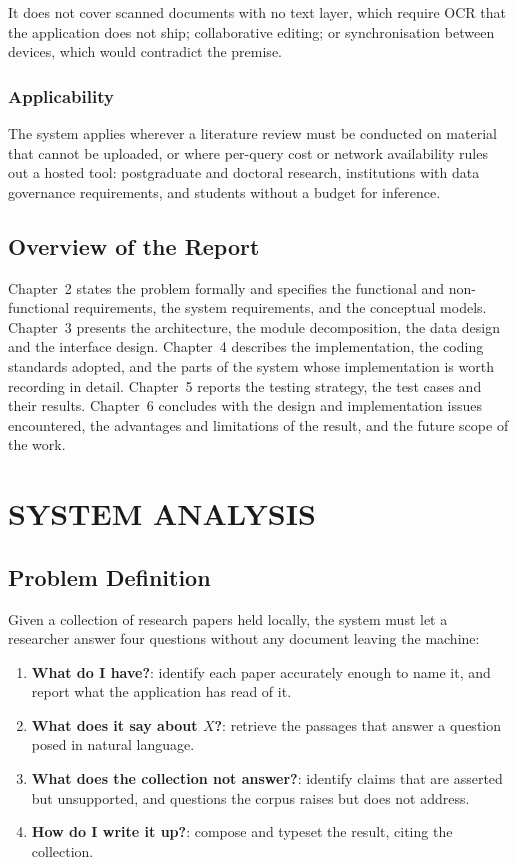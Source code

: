 \documentclass[12pt,a4paper]{report}
\begin{document}
It does not cover scanned documents with no text layer, which require OCR that
the application does not ship; collaborative editing; or synchronisation
between devices, which would contradict the premise.

\subsection{Applicability}

The system applies wherever a literature review must be conducted on material
that cannot be uploaded, or where per-query cost or network availability rules
out a hosted tool: postgraduate and doctoral research, institutions with data
governance requirements, and students without a budget for inference.

\section{Overview of the Report}

Chapter~2 states the problem formally and specifies the functional and
non-functional requirements, the system requirements, and the conceptual
models. Chapter~3 presents the architecture, the module decomposition, the
data design and the interface design. Chapter~4 describes the implementation,
the coding standards adopted, and the parts of the system whose implementation
is worth recording in detail. Chapter~5 reports the testing strategy, the test
cases and their results. Chapter~6 concludes with the design and implementation
issues encountered, the advantages and limitations of the result, and the
future scope of the work.

\chapter{SYSTEM ANALYSIS}

\section{Problem Definition}

Given a collection of research papers held locally, the system must let a
researcher answer four questions without any document leaving the machine:

\begin{enumerate}[leftmargin=*]
  \item \textbf{What do I have?}: identify each paper accurately enough to
        name it, and report what the application has read of it.
  \item \textbf{What does it say about $X$?}: retrieve the passages that
        answer a question posed in natural language.
  \item \textbf{What does the collection not answer?}: identify claims that
        are asserted but unsupported, and questions the corpus raises but does
        not address.
  \item \textbf{How do I write it up?}: compose and typeset the result,
        citing the collection.
\end{enumerate}
\end{document}
